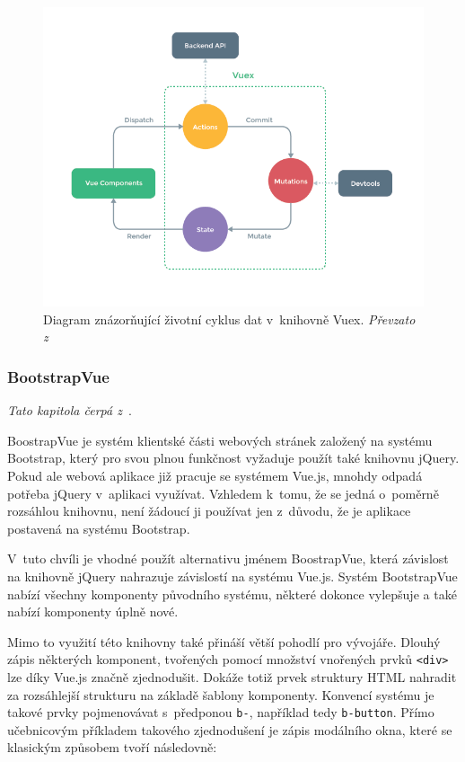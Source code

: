 \begin{figure}[H]
	\centering
	\includegraphics[width=\textwidth]{obrazky-figures/vuex.png}
	\caption{Diagram znázorňující životní cyklus dat v~knihovně Vuex. \emph{Převzato z~\cite{bib:vuex-doc}}}
	\label{img:vuex-dataflow}
\end{figure}

\blindtext


\subsubsection*{BootstrapVue}
\emph{Tato kapitola čerpá z~\cite{bib:bootstrap-vue}}.

BoostrapVue je systém klientské části webových stránek založený na systému Bootstrap, který pro svou plnou funkčnost vyžaduje použít také knihovnu jQuery. Pokud ale webová aplikace již pracuje se systémem Vue.js, mnohdy odpadá potřeba jQuery v~aplikaci využívat. Vzhledem k~tomu, že se jedná o~poměrně rozsáhlou knihovnu, není žádoucí ji používat jen z~důvodu, že je aplikace postavená na systému Bootstrap.

V~tuto chvíli je vhodné použít alternativu jménem BoostrapVue, která závislost na knihovně jQuery nahrazuje závislostí na systému Vue.js. Systém BootstrapVue nabízí všechny komponenty původního systému, některé dokonce vylepšuje a také nabízí komponenty úplně nové.

Mimo to využití této knihovny také přináší větší pohodlí pro vývojáře. Dlouhý zápis některých komponent, tvořených pomocí množství vnořených prvků \texttt{<div>} lze díky Vue.js značně zjednodušit. Dokáže totiž prvek struktury HTML nahradit za rozsáhlejší strukturu na základě šablony komponenty. Konvencí systému je takové prvky pojmenovávat s~předponou \texttt{b-}, například tedy \texttt{b-button}.
Přímo učebnicovým příkladem takového zjednodušení je zápis modálního okna, které se klasickým způsobem tvoří následovně:

